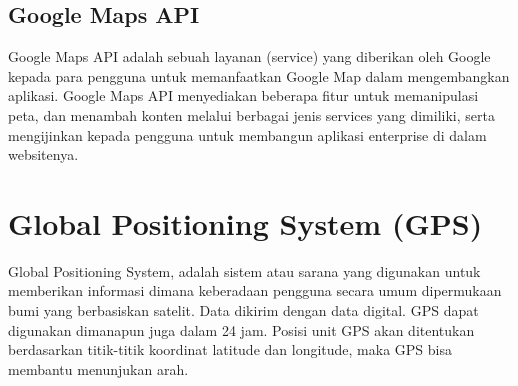 \subsection {Google Maps API }
Google Maps API adalah sebuah layanan (service) yang diberikan oleh Google
kepada para pengguna untuk memanfaatkan Google Map dalam mengembangkan
aplikasi. Google Maps API menyediakan beberapa fitur untuk memanipulasi peta, dan
menambah konten melalui berbagai jenis services yang dimiliki, serta mengijinkan
kepada pengguna untuk membangun aplikasi enterprise di dalam websitenya.


\section{Global Positioning System (GPS)}
Global Positioning System, adalah sistem atau sarana yang digunakan untuk memberikan informasi dimana keberadaan pengguna secara umum dipermukaan bumi yang berbasiskan satelit. Data dikirim dengan data digital. GPS dapat digunakan dimanapun juga dalam 24 jam. Posisi unit GPS akan ditentukan berdasarkan titik-titik koordinat latitude dan longitude, maka GPS bisa membantu menunjukan arah. 
